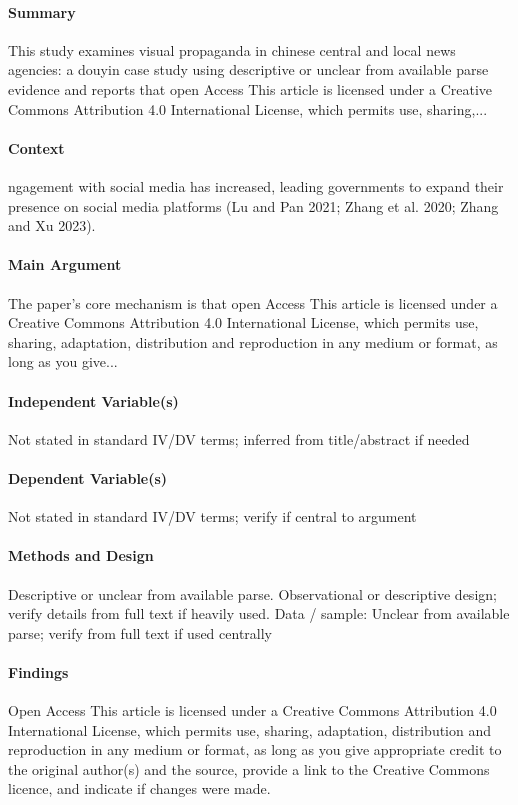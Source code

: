 \documentclass[12pt]{article}
\begin{document}
\paragraph{Summary} This study examines visual propaganda in chinese central and local news agencies: a douyin case study using descriptive or unclear from available parse evidence and reports that open Access This article is licensed under a Creative Commons Attribution 4.0 International License, which permits use, sharing,...

\paragraph{Context} ngagement with social media has increased, leading governments to expand their presence on social media platforms (Lu and Pan 2021; Zhang et al. 2020; Zhang and Xu 2023).

\paragraph{Main Argument} The paper's core mechanism is that open Access This article is licensed under a Creative Commons Attribution 4.0 International License, which permits use, sharing, adaptation, distribution and reproduction in any medium or format, as long as you give...

\paragraph{Independent Variable(s)} Not stated in standard IV/DV terms; inferred from title/abstract if needed

\paragraph{Dependent Variable(s)} Not stated in standard IV/DV terms; verify if central to argument

\paragraph{Methods and Design} Descriptive or unclear from available parse. Observational or descriptive design; verify details from full text if heavily used. Data / sample: Unclear from available parse; verify from full text if used centrally

\paragraph{Findings} Open Access This article is licensed under a Creative Commons Attribution 4.0 International License, which permits use, sharing, adaptation, distribution and reproduction in any medium or format, as long as you give appropriate credit to the original author(s) and the source, provide a link to the Creative Commons licence, and indicate if changes were made.
\end{document}
